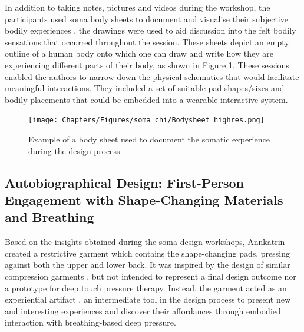 In addition to taking notes, pictures and videos during the workshop, the participants used soma body sheets to document and visualise their subjective bodily experiences \cite{candy_intimate_2014}, the drawings were used to aid discussion into the felt bodily sensations that occurred throughout the session. These sheets depict an empty outline of a human body onto which one can draw and write how they are experiencing different parts of their body, as shown in Figure \ref{fig:bodysheets}. These sessions enabled the authors to narrow down the physical schematics that would facilitate meaningful interactions. They included a set of suitable pad shapes/sizes and bodily placements that could be embedded into a wearable interactive system.


\begin{figure}[b]
  \centering
  \texttt{[image: Chapters/Figures/soma\_chi/Bodysheet\_highres.png]}
  \caption[Example of a body sheet]{Example of a body sheet used to document the somatic experience during the design process.}
  \label{fig:bodysheets}
\end{figure}

\subsection*{Autobiographical Design: First-Person Engagement with Shape-Changing Materials and Breathing}
\label{sec:first_person_engagement}

Based on the insights obtained during the soma design workshops, Annkatrin created a restrictive garment which contains the shape-changing pads, pressing against both the upper and lower back. It was inspired by the design of similar compression garments \cite{vaucelle_design_2009, foo_user_2019}, but not intended to represent a final design outcome nor a prototype for deep touch pressure therapy. Instead, the garment acted as an experiential artifact \cite{sundstrom_experiential_2011}, an intermediate tool in the design process to present new and interesting experiences and discover their affordances through embodied interaction with breathing-based deep pressure.

